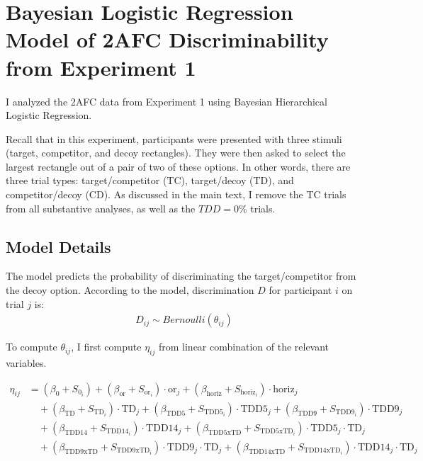 \chapter{Bayesian Logistic Regression Model of 2AFC Discriminability from Experiment 1}
I analyzed the 2AFC data from Experiment 1 using Bayesian Hierarchical Logistic Regression. 

Recall that in this experiment, participants were presented with three stimuli (target, competitor, and decoy rectangles). They were then asked to select the largest rectangle out of a pair of two of these options. In other words, there are three trial types: target/competitor (TC), target/decoy (TD), and competitor/decoy (CD). As discussed in the main text, I remove the TC trials from all substantive analyses, as well as the $TDD=0\%$ trials. 

\section{Model Details} 

The model predicts the probability of discriminating the target/competitor from the decoy option. According to the model, discrimination $D$ for participant $i$ on trial $j$ is:
\begin{align}
    D_{ij} \sim Bernoulli(\theta_{ij})
\end{align}

To compute $\theta_{ij}$, I first compute $\eta_{ij}$ from linear combination of the relevant variables.

\begin{align}
    \eta_{ij} &= (\beta_{0} + S_{0_{i}}) + (\beta_{\mathrm{or}} + S_{\mathrm{or}_{i}}) \cdot \mathrm{or}_{j} + (\beta_{\mathrm{horiz}} + S_{\mathrm{horiz}_{i}}) \cdot \mathrm{horiz}_{j} \\
    &\quad + (\beta_{\mathrm{TD}} + S_{\mathrm{TD}_{i}}) \cdot \mathrm{TD}_{j} + (\beta_{\mathrm{TDD5}} + S_{\mathrm{TDD5}_{i}}) \cdot \mathrm{TDD5}_{j} + (\beta_{\mathrm{TDD9}} + S_{\mathrm{TDD9}_{i}}) \cdot \mathrm{TDD9}_{j} \\
    &\quad + (\beta_{\mathrm{TDD14}} + S_{\mathrm{TDD14}_{i}}) \cdot \mathrm{TDD14}_{j} + (\beta_{\mathrm{TDD5xTD}} + S_{\mathrm{TDD5xTD}_{i}}) \cdot \mathrm{TDD5}_{j} \cdot \mathrm{TD}_{j} \\
    &\quad + (\beta_{\mathrm{TDD9xTD}} + S_{\mathrm{TDD9xTD}_{i}}) \cdot \mathrm{TDD9}_{j} \cdot \mathrm{TD}_{j} + (\beta_{\mathrm{TDD14xTD}} + S_{\mathrm{TDD14xTD}_{i}}) \cdot \mathrm{TDD14}_{j} \cdot \mathrm{TD}_{j}
\end{align}

